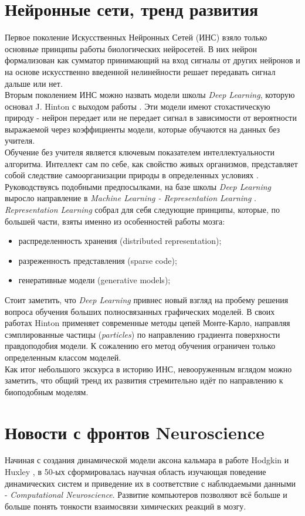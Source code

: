 \documentclass[a4paper,10pt]{article}
\begin{document}
\section{Нейронные сети, тренд развития}
Первое поколение Искусственных Нейронных Сетей (ИНС) взяло только основные принципы работы биологических нейросетей. В них нейрон формализован как сумматор принимающий на вход сигналы от других нейронов и на основе искусственно введенной нелинейности решает передавать сигнал дальше или нет.\\
\indent Вторым поколением ИНС можно назвать модели школы \textit{Deep Learning}, которую основал J. Hinton с выходом работы \cite{hinton2006}. Эти модели имеют стохастическую природу - нейрон передает или не передает сигнал в зависимости от вероятности выражаемой через коэффициенты модели, которые обучаются на данных без учителя.\\ 
\indent Обучение без учителя является ключевым показателем интеллектуальности алгоритма. Интеллект сам по себе, как свойство живых организмов, представляет собой следствие самоорганизации природы в определенных условиях \cite{evolut}. Руководствуясь подобными предпосылками, на базе школы \textit{Deep Learning} выросло направление в \textit{Machine Learning - Representation Learning} \cite{yoshua}.\\
\indent \textit{Representation Learning} собрал для себя следующие принципы, которые, по большей части, взяты именно из особенностей работы мозга:
\begin{itemize}
\item распределенность хранения (distributed representation);
\item разреженность представления (sparse code);
\item генеративные модели (generative models);
\end{itemize} 
\indent \indent Стоит заметить, что \textit{Deep Learning} привнес новый взгляд на пробему решения вопроса обучения больших полносвязанных графических моделей. В своих работах Hinton применяет современные методы цепей Монте-Карло, направляя сэмплированные частицы (\textit{particles}) по направлению градиента поверхности правдоподобия модели. К сожалению его метод обучения ограничен только определенным классом моделей.\\
\indent Как итог небольшого экскурса в историю ИНС, невооруженным вглядом можно заметить, что общий тренд их развития стремительно идёт по направлению к биоподобным моделям.
\section{Новости с фронтов Neuroscience}
\label{sec:neuroscience}
Начиная с создания динамической модели аксона кальмара в работе Hodgkin и Huxley \cite{hodhux}, в 50-ых сформировалась научная область изучающая поведение динамических систем и приведение их в соответствие с наблюдаемыми данными - \textit{Computational Neuroscience}. Развитие компьютеров позволяют всё больше и больше понять тонкости взаимосвязи химических реакций в мозгу.\\ 
\end{document}
